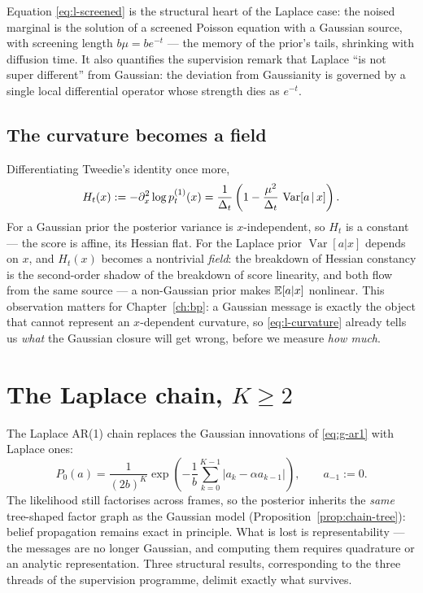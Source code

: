 Equation \eqref{eq:l-screened} is the structural heart of the Laplace case:
the noised marginal is the solution of a screened Poisson equation with a
Gaussian source, with screening length $b\mu = b e^{-t}$ --- the memory of
the prior's tails, shrinking with diffusion time. It also quantifies the
supervision remark that Laplace ``is not super different'' from Gaussian:
the deviation from Gaussianity is governed by a single local differential
operator whose strength dies as $e^{-t}$.

\subsection{The curvature becomes a field}

Differentiating Tweedie's identity once more,
\begin{equation}
  H_t(x) := -\partial_x^2 \log p_t^{(1)}(x)
  = \frac{1}{\Delta_t}
    \left( 1 - \frac{\mu^2}{\Delta_t}\, \operatorname{Var}[a \,|\, x] \right).
  \label{eq:l-curvature}
\end{equation}
For a Gaussian prior the posterior variance is $x$-independent, so $H_t$ is
a constant --- the score is affine, its Hessian flat. For the Laplace prior
$\operatorname{Var}[a|x]$ depends on $x$, and $H_t(x)$ becomes a nontrivial
\emph{field}: the breakdown of Hessian constancy is the second-order shadow
of the breakdown of score linearity, and both flow from the same source ---
a non-Gaussian prior makes $\mathbb{E}[a|x]$ nonlinear. This observation matters
for Chapter~\ref{ch:bp}: a Gaussian message is exactly the object that
cannot represent an $x$-dependent curvature, so \eqref{eq:l-curvature}
already tells us \emph{what} the Gaussian closure will get wrong, before we
measure \emph{how much}.

\section{The Laplace chain, $K \geq 2$}\label{sec:l-chain}

The Laplace AR(1) chain replaces the Gaussian innovations of
\eqref{eq:g-ar1} with Laplace ones:
\begin{equation}
  P_0(a) = \frac{1}{(2b)^K}
  \exp\!\left( -\frac{1}{b} \sum_{k=0}^{K-1}
    \big| a_k - \alpha a_{k-1} \big| \right),
  \qquad a_{-1} := 0 .
  \label{eq:l-chain-prior}
\end{equation}
The likelihood still factorises across frames, so the posterior inherits
the \emph{same} tree-shaped factor graph as the Gaussian model
(Proposition~\ref{prop:chain-tree}): belief propagation remains exact in
principle. What is lost is representability --- the messages are no longer
Gaussian, and computing them requires quadrature or an analytic
representation. Three structural results, corresponding to the three
threads of the supervision programme, delimit exactly what survives.


